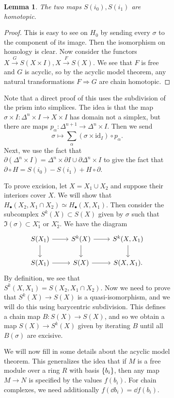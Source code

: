 \documentclass[leqno, openany]{memoir}
\newtheorem{lem}[thm]{Lemma}
\theoremstyle{definition}
\theoremstyle{remark}
\theoremstyle{plain}
\theoremstyle{definition}
\theoremstyle{remark}
\newcommand{\mr}[1]{\mathrm{#1}}
\begin{document}
\begin{figure}[H]
\begin{figure}[H]
\begin{lem} The two maps $S(i_0), S(i_1)$ are homotopic.  \end{lem}

\begin{proof} This is easy to see on $H_0$ by sending every $\sigma$ to the
    component of its image. Then the isomorphism on homology is clear. Now
    consider the functors $X \xrightarrow{G} S(X \times I), X \xrightarrow{F}
    S(X)$. We see that $F$ is free and $G$ is acyclic, so by the acyclic model
    theorem, any natural transformations $F \Rightarrow G$ are chain homotopic.
\end{proof}

Note that a direct proof of this uses the subdivision of the prism into
simplices. The idea is that the map $\sigma \times I \colon \Delta^n \times I
\to X \times I$ has domain not a simplex, but there are maps $p_{\alpha} \colon
\Delta^{n+1} \to \Delta^n \times I$. Then we send \[ \sigma \mapsto
\sum_{\alpha} (\sigma \times \mr{id}_I) \circ p_{\alpha}. \] Next, we use the
fact that $\partial(\Delta^n \times I) = \Delta^n \times \partial I \cup
\partial \Delta^n \times I$ to give the fact that $\partial \circ H = S(i_0) -
S(i_1) + H \circ \partial$.

To prove excision, let $X = X_1 \cup X_2$ and suppose their interiors cover
$X$. We will show that $H_{\bullet}(X_2, X_1 \cap X_2) \simeq H_{\bullet}(X,
X_1)$. Then consider the subcomplex $S^k(X) \subset S(X)$ given by $\sigma$
such that $\Im(\sigma) \subset X_1^{\circ}$ or $X_2^{\circ}$. We have the
diagram \begin{equation*} \begin{tikzcd} S(X_1) \arrow{d} \arrow{r} & S^k(X)
\arrow{d} \arrow{r} & S^k(X, X_1) \arrow{d} \\ S(X_1) \arrow{r} & S(X)
\arrow{r} & S(X, X_1).  \end{tikzcd} \end{equation*} By definition, we see that
$S^k(X, X_1) = S(X_2, X_1 \cap X_2)$. Now we need to prove that $S^k(X) \to
S(X)$ is a quasi-isomorphism, and we will do this using barycentric
subdivision. This defines a chain map $B \colon S(X) \to S(X)$, and so we
obtain a map $S(X) \to S^k(X)$ given by iterating $B$ until all $B(\sigma)$ are
excisive.

We will now fill in some details about the acyclic model theorem. This
generalizes the idea that if $M$ is a free module over a ring $R$ with basis
$\qty{b_i}$, then any map $M \to N$ is specified by the values $f(b_i)$. For
chain complexes, we need additionally $f(\dd b_i) = \dd{f(b_i)}$.


\end{figure}
\end{figure}
\end{document}
